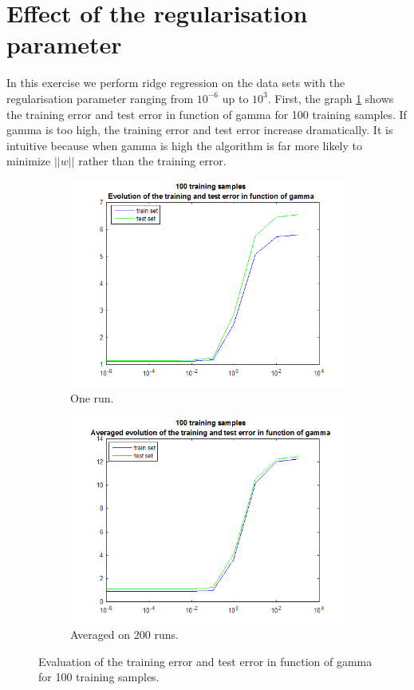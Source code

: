 \documentclass{article} %
\begin{document}
\section{Effect of the regularisation parameter}
In this exercise we perform ridge regression on the data sets with the regularisation parameter ranging from $10^{-6}$ up to $10^3$.
First, the graph \ref{fig:ex4_100} shows the training error and test error in function of gamma for 100 training samples. If gamma is too high, the training error and test error increase dramatically. It is intuitive because when gamma is high the algorithm is far more likely to minimize $||w||$  rather than the training error.

 \begin{figure}[h]
\center
 \begin{subfigure}[b]{0.45\textwidth}
        \includegraphics[width=\textwidth]{4_100}
        \caption{One run.}
    \end{subfigure}
    \begin{subfigure}[b]{0.45\textwidth}
        \includegraphics[width=\textwidth]{4_100_avg}
        \caption{Averaged on 200 runs.}
    \end{subfigure}
    \caption{Evaluation of the training error and test error in function of gamma for 100 training samples.}
    \label{fig:ex4_100}
\end{figure}
\end{document}
